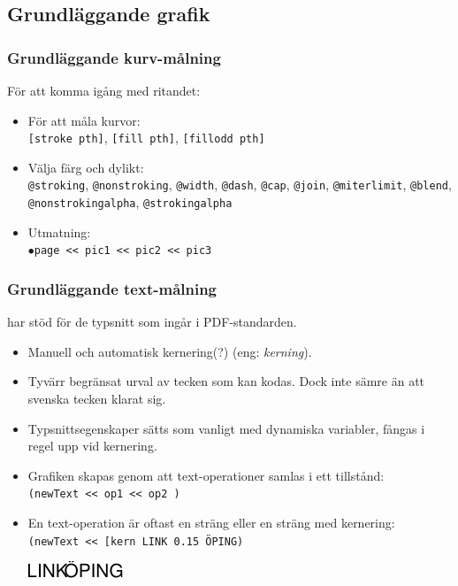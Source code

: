 \documentclass[noamsthm,handout]{beamer}
\newcommand{\inEnglish}[1]{(eng: \emph{#1})}
\begin{document}
\subsection{Grundläggande grafik}
\begin{frame}\frametitle{Grundläggande kurv-målning}
  För att komma igång med ritandet:
  \begin{itemize}
  \item För att måla kurvor:\\
    \texttt{[{\color{red}stroke} pth]}, \texttt{[{\color{red}fill} pth]}, \texttt{[{\color{red}fillodd} pth]}
  \item Välja färg och dylikt:\\
    \texttt{@stroking}, \texttt{@nonstroking}, \texttt{@width}, \texttt{@dash}, \texttt{@cap}, \texttt{@join}, \texttt{@miterlimit}, \texttt{@blend}, \texttt{@nonstrokingalpha}, \texttt{@strokingalpha}
  \item Utmatning:\\
    \texttt{$\bullet$page <{}< pic1 <{}< pic2 <{}< pic3}
  \end{itemize}
\end{frame}
\begin{frame}\frametitle{Grundläggande text-målning}
  \Shapes har stöd för de typsnitt som ingår i PDF-standarden.
  \begin{itemize}
  \item Manuell och automatisk kernering(?) \inEnglish{kerning}.
  \item Tyvärr begränsat urval av tecken som kan kodas.  Dock inte sämre än att svenska tecken klarat sig.
  \item Typsnittsegenskaper sätts som vanligt med dynamiska variabler, fångas i regel upp vid kernering.
  \item Grafiken skapas genom att text-operationer samlas i ett tillstånd:\\
    \texttt{({\color{red}newText} <{}< op1 <{}< op2 )}
  \item En text-operation är oftast en sträng eller en sträng med kernering:\\
    \texttt{({\color{red}newText} <{}< [kern \textasciigrave{}LINK\textasciiacute{} 0.15 \textasciigrave{}ÖPING\textasciiacute{})}\\
    \begin{center}
      \includegraphics{figures/linkoping}
    \end{center}
  \end{itemize}
\end{frame}
\end{document}

